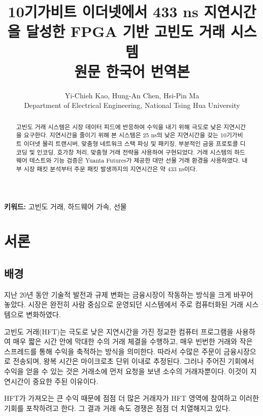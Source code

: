 \documentclass[11pt,a4paper]{article}
\title{10기가비트 이더넷에서 433 ns 지연시간을 달성한 FPGA 기반 고빈도 거래 시스템\\
\large 원문 한국어 번역본}
\author{Yi-Chieh Kao, Hung-An Chen, Hsi-Pin Ma\\
Department of Electrical Engineering, National Tsing Hua University}
\date{}
\begin{document}
\maketitle

\begin{abstract}
고빈도 거래 시스템은 시장 데이터 피드에 반응하여 수익을 내기 위해 극도로 낮은 지연시간을 요구한다. 지연시간을 줄이기 위해 본 시스템은 25 ns의 낮은 지연시간을 갖는 10기가비트 이더넷 물리 트랜시버, 맞춤형 네트워크 스택 파싱 및 패키징, 부분적인 금융 프로토콜 디코딩 및 인코딩, 호가창 처리, 맞춤형 거래 전략을 사용하여 구현되었다. 거래 시스템의 하드웨어 테스트와 기능 검증은 Yuanta Futures가 제공한 대만 선물 거래 환경을 사용하였다. 내부 시장 패킷 분석부터 주문 패킷 발생까지의 지연시간은 약 433 ns이다.
\end{abstract}

\noindent\textbf{키워드:} 고빈도 거래, 하드웨어 가속, 선물

\section{서론}

\subsection{배경}
지난 20년 동안 기술적 발전과 규제 변화는 금융시장이 작동하는 방식을 크게 바꾸어 놓았다. 시장은 완전히 사람 중심으로 운영되던 시스템에서 주로 컴퓨터화된 거래 시스템으로 변화하였다.

고빈도 거래(HFT)는 극도로 낮은 지연시간을 가진 정교한 컴퓨터 프로그램을 사용하여 매우 짧은 시간 안에 막대한 수의 거래 체결을 수행하고, 매우 빈번한 거래와 작은 스프레드를 통해 수익을 축적하는 방식을 의미한다. 따라서 수많은 주문이 금융시장으로 전송되며, 왕복 시간은 마이크로초 단위 이내로 추정된다. 그러나 주어진 기회에서 수익을 얻을 수 있는 것은 거래소에 먼저 요청을 보낸 소수의 거래자뿐이다. 이것이 지연시간이 중요한 주된 이유이다.

HFT가 가져오는 큰 수익 때문에 점점 더 많은 거래자가 HFT 영역에 참여하고 이러한 기회를 포착하려고 한다. 그 결과 거래 속도 경쟁은 점점 더 치열해지고 있다.
\end{document}
